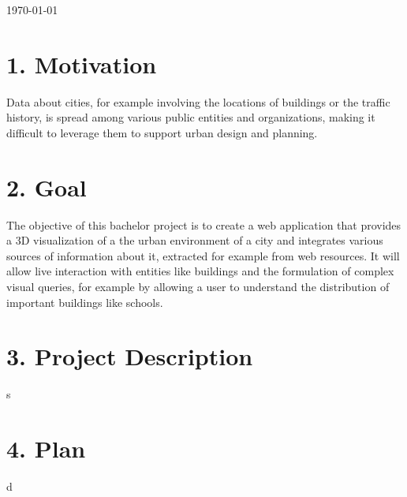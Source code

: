 \documentclass[11pt]{report}
\begin{document}
\begin{titlepage}

{\large \today}\\[3cm] %



 

\vfill %

\end{titlepage}

\section*{1. Motivation}
Data about cities, for example involving the locations of buildings or the traffic history, is spread among various public entities and organizations, making it difficult to leverage them to support urban design and planning.
\section*{2. Goal}
The objective of this bachelor project is to create a web application that provides a 3D visualization of a the urban environment of a city and integrates various sources of information about it, extracted for example from web resources. It will allow live interaction with entities like buildings and the formulation of complex visual queries, for example by allowing a user to understand the distribution of important buildings like schools.

\section*{3. Project Description}
s
\section*{4. Plan}
d
\end{document}
